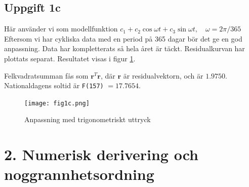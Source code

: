 \documentclass[10,]{article}
\newenvironment{Shaded}{}{}
\newcommand{\FloatTok}[1]{\textcolor[rgb]{0.25,0.63,0.44}{{#1}}}
\newcommand{\StringTok}[1]{\textcolor[rgb]{0.25,0.44,0.63}{{#1}}}
\newcommand{\CommentTok}[1]{\textcolor[rgb]{0.38,0.63,0.69}{\textit{{#1}}}}
\newcommand{\NormalTok}[1]{{#1}}
\begin{document}
\subsection{Uppgift 1c}\label{uppgift-1c}

Här använder vi som modellfunktion
\(c_1 + c_2 \cos{\omega t} + c_3 \sin{\omega t},\quad \omega = 2\pi/365\)
Eftersom vi har cykliska data med en period på 365 dagar bör det ge en
god anpassning. Data har kompletterats så hela året är täckt.
Residualkurvan har plottats separat. Resultatet visas i figur
\ref{fig:fig1c}.

Felkvadratsumman fås som \(\mathbf{r}^T \mathbf{r}\), där \(\mathbf{r}\)
är residualvektorn, och är \(1.9750\). Nationaldagens soltid är
\texttt{F(157)} \(= 17.7654\).

\begin{figure}[htbp]
\centering
\texttt{[image: fig1c.png]}
\caption{Anpassning med trigonometriskt uttryck\label{fig:fig1c}}
\end{figure}

\begin{Shaded}
\end{Shaded}

\section{2. Numerisk derivering och
noggrannhetsordning}\label{numerisk-derivering-och-noggrannhetsordning}
\end{document}
